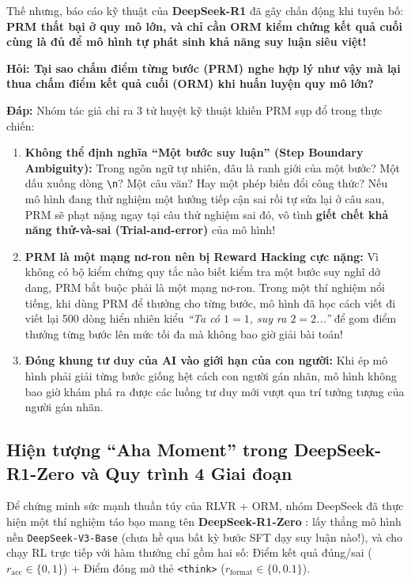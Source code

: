 Thế nhưng, báo cáo kỹ thuật của \textbf{DeepSeek-R1} \citep{deepseek2025r1} đã gây chấn động khi tuyên bố: \textbf{PRM thất bại ở quy mô lớn, và chỉ cần ORM kiểm chứng kết quả cuối cùng là đủ để mô hình tự phát sinh khả năng suy luận siêu việt!}

\begin{debate}
\textbf{Hỏi: Tại sao chấm điểm từng bước (PRM) nghe hợp lý như vậy mà lại thua chấm điểm kết quả cuối (ORM) khi huấn luyện quy mô lớn?}

\textbf{Đáp:} Nhóm tác giả \citet{deepseek2025r1} chỉ ra 3 tử huyệt kỹ thuật khiến PRM sụp đổ trong thực chiến:
\begin{enumerate}
  \item \textbf{Không thể định nghĩa ``Một bước suy luận'' (Step Boundary Ambiguity):} Trong ngôn ngữ tự nhiên, đâu là ranh giới của một bước? Một dấu xuống dòng \texttt{\textbackslash n}? Một câu văn? Hay một phép biến đổi công thức? Nếu mô hình đang thử nghiệm một hướng tiếp cận sai rồi tự sửa lại ở câu sau, PRM sẽ phạt nặng ngay tại câu thử nghiệm sai đó, vô tình \textbf{giết chết khả năng thử-và-sai (Trial-and-error)} của mô hình!
  \item \textbf{PRM là một mạng nơ-ron nên bị Reward Hacking cực nặng:} Vì không có bộ kiểm chứng quy tắc nào biết kiểm tra một bước suy nghĩ dở dang, PRM bắt buộc phải là một mạng nơ-ron. Trong một thí nghiệm nổi tiếng, khi dùng PRM để thưởng cho từng bước, mô hình đã học cách viết đi viết lại 500 dòng hiển nhiên kiểu \textit{``Ta có $1 = 1$, suy ra $2 = 2$...''} để gom điểm thưởng từng bước lên mức tối đa mà không bao giờ giải bài toán!
  \item \textbf{Đóng khung tư duy của AI vào giới hạn của con người:} Khi ép mô hình phải giải từng bước giống hệt cách con người gán nhãn, mô hình không bao giờ khám phá ra được các luồng tư duy mới vượt qua trí tưởng tượng của người gán nhãn.
\end{enumerate}
\end{debate}

\subsection{Hiện tượng ``Aha Moment'' trong DeepSeek-R1-Zero và Quy trình 4 Giai đoạn}

Để chứng minh sức mạnh thuần túy của RLVR + ORM, nhóm DeepSeek đã thực hiện một thí nghiệm táo bạo mang tên \textbf{DeepSeek-R1-Zero} \citep{deepseek2025r1}: lấy thẳng mô hình nền \texttt{DeepSeek-V3-Base} (chưa hề qua bất kỳ bước SFT dạy suy luận nào!), và cho chạy RL trực tiếp với hàm thưởng chỉ gồm hai số: Điểm kết quả đúng/sai ($r_{\text{acc}} \in \{0, 1\}$) + Điểm đóng mở thẻ \texttt{<think>} ($r_{\text{format}} \in \{0, 0.1\}$).

